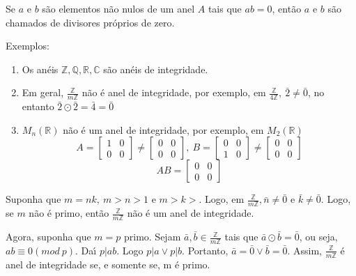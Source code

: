 Se $a$ e $b$ s{\~a}o elementos n{\~a}o nulos de um anel $A$ tais que $ab=0$, ent{\~a}o $a$ e $b$ s{\~a}o chamados de divisores pr{\'o}prios de zero.

Exemplos:
\begin{enumerate}
\item Os an{\'e}is $\mathbb{Z},\mathbb{Q},\mathbb{R},\mathbb{C}$ s{\~a}o an{\'e}is de integridade.
\item Em geral, $\displaystyle\frac{\mathbb{Z}}{m\mathbb{Z}}$ n{\~a}o {\'e} anel de integridade, por exemplo, em $\displaystyle\frac{\mathbb{Z}}{4\mathbb{Z}},\ \bar{2}\neq\bar{0}$, no entanto $\bar{2}\odot\bar{2}=\bar{4}=\bar{0}$
\item $M_{n}(\mathbb{R})$ n{\~a}o {\'e} um anel de integridade, por exemplo, em $M_{2}(\mathbb{R})$\\
\[A=\left[\begin{array}{cc}
1 & 0\\
0 & 0
\end{array}\right]\neq\left[\begin{array}{cc}
0 & 0\\
0 & 0
\end{array}\right],\ B=\left[\begin{array}{cc}
0 & 0\\
1 & 0
\end{array}\right]\neq\left[\begin{array}{cc}
0 & 0\\
0 & 0
\end{array}\right]\]
\[AB=\left[\begin{array}{cc}
0 & 0\\
0 & 0
\end{array}\right]\]

\end{enumerate}

Suponha que $m=nk,\ m>n>1$ e $m>k>$. Logo, em $\displaystyle\frac{\mathbb{Z}}{m\mathbb{Z}}, \bar{n}\neq\bar{0}$ e $\bar{k}\neq\bar{0}$. Logo, se $m$ n{\~a}o {\'e} primo, ent{\~a}o $\displaystyle\frac{\mathbb{Z}}{m\mathbb{Z}}$ n{\~a}o {\'e} um anel de integridade.

Agora, suponha que $m=p$ primo. Sejam $\bar{a},\bar{b}\in\displaystyle\frac{\mathbb{Z}}{m\mathbb{Z}}$ tais que $\bar{a}\odot\bar{b}=\bar{0}$, ou seja, $ab\equiv 0(mod\ p)$. Da{\'\i} $p|ab$. Logo $p|a\vee p|b$. Portanto, $\bar{a}=\bar{0}\vee \bar{b}=\bar{0}$. Assim, $\displaystyle\frac{\mathbb{Z}}{m\mathbb{Z}}$ {\'e} anel de integridade se, e somente se, m {\'e} primo.

